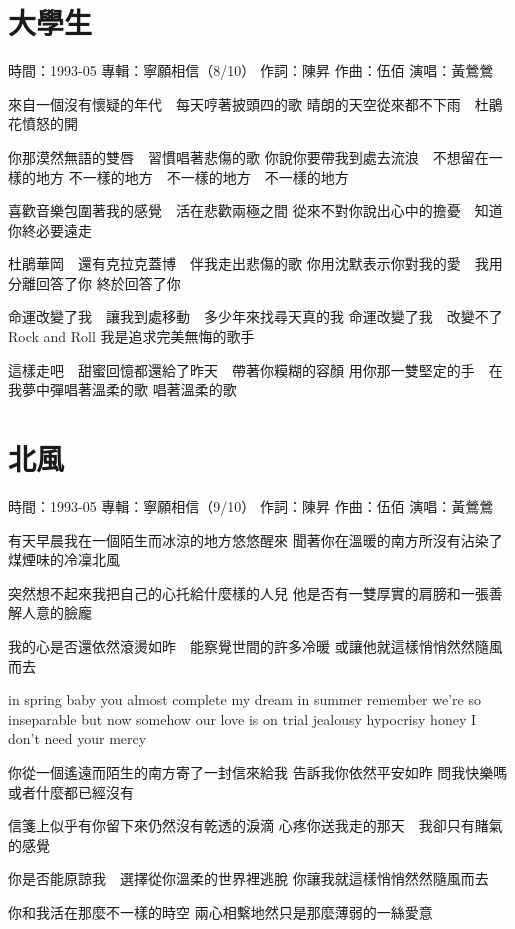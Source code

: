 \documentclass[UTF8,a4paper,oneside,twocolumn,12pt]{ctexbook}
\newcommand{\infopair}[2]{\textbullet #1：#2}
\newcommand{\zc}[1][伍佰]{\infopair{作詞}{#1}}
\newcommand{\zq}[1][伍佰]{\infopair{作曲}{#1}}
\newcommand{\zj}[1]{\infopair{專輯}{#1}}
\newcommand{\sj}[1]{\infopair{時間}{#1}}
\newenvironment{info}{\begin{flushleft}\kaishu
	}
	{\end{flushleft}\normalsize\yahei\par}
\newenvironment{lyric}{
	}
{}
\begin{document}
\section{大學生}
\begin{info}%
	\sj{1993-05}
	\zj{寧願相信（8/10）}
	\zc[陳昇]
	\zq
	\infopair{演唱}{黃鶯鶯}
\end{info}
\begin{lyric}
	來自一個沒有懷疑的年代　每天哼著披頭四的歌
	晴朗的天空從來都不下雨　杜鵑花憤怒的開

	你那漠然無語的雙唇　習慣唱著悲傷的歌
	你說你要帶我到處去流浪　不想留在一樣的地方
	不一樣的地方　不一樣的地方　不一樣的地方

	喜歡音樂包圍著我的感覺　活在悲歡兩極之間
	從來不對你說出心中的擔憂　知道你終必要遠走

	杜鵑華岡　還有克拉克蓋博　伴我走出悲傷的歌
	你用沈默表示你對我的愛　我用分離回答了你
	終於回答了你

	命運改變了我　讓我到處移動　多少年來找尋天真的我
	命運改變了我　改變不了Rock and Roll
	我是追求完美無悔的歌手

	這樣走吧　甜蜜回憶都還給了昨天　帶著你糢糊的容顏
	用你那一雙堅定的手　在我夢中彈唱著溫柔的歌
	唱著溫柔的歌
\end{lyric}

\section{北風}
\begin{info}%
	\sj{1993-05}
	\zj{寧願相信（9/10）}
	\zc[陳昇]
	\zq
	\infopair{演唱}{黃鶯鶯}
\end{info}
\begin{lyric}
	有天早晨我在一個陌生而冰涼的地方悠悠醒來
	聞著你在溫暖的南方所沒有沾染了煤煙味的冷凜北風

	突然想不起來我把自己的心托給什麼樣的人兒
	他是否有一雙厚實的肩膀和一張善解人意的臉龐

	我的心是否還依然滾燙如昨　能察覺世間的許多冷暖
	或讓他就這樣悄悄然然隨風而去

	in spring baby
	you almost complete my dream
	in summer remember
	we're so inseparable
	but now somehow
	our love is on trial
	jealousy hypocrisy
	honey I don't need your mercy

	你從一個遙遠而陌生的南方寄了一封信來給我
	告訴我你依然平安如昨
	問我快樂嗎　或者什麼都已經沒有

	信箋上似乎有你留下來仍然沒有乾透的淚滴
	心疼你送我走的那天　我卻只有賭氣的感覺

	你是否能原諒我　選擇從你溫柔的世界裡逃脫
	你讓我就這樣悄悄然然隨風而去

	你和我活在那麼不一樣的時空
	兩心相繫地然只是那麼薄弱的一絲愛意
\end{lyric}
\end{document}
